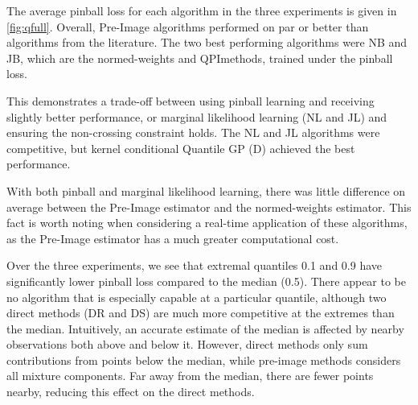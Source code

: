 \documentclass[twoside]{article} \usepackage{aistats2017}
\theoremstyle{definition}
\theoremstyle{theorem}
\newcommand{\qpi}{QPI}
\begin{document}
		The average pinball loss for each algorithm in the three experiments is given in \cref{fig:qfull}. Overall, Pre-Image algorithms performed on par or better than algorithms from the literature. The two best performing algorithms were NB and JB, which are the normed-weights and \qpi\space methods, trained under the pinball loss. %

		This demonstrates a trade-off between using pinball learning and receiving slightly better performance, or marginal likelihood learning (NL and JL) and ensuring the non-crossing constraint holds. The NL and JL algorithms were competitive, but kernel conditional Quantile GP (D) achieved the best performance.

		With both pinball and marginal likelihood learning, there was little difference on average between the Pre-Image estimator and the normed-weights estimator. This fact is worth noting when considering a real-time application of these algorithms, as the Pre-Image estimator has a much greater computational cost.
		
		Over the three experiments, we see that extremal quantiles 0.1 and 0.9 have significantly lower pinball loss compared to the median (0.5). There appear to be no algorithm that is especially capable at a particular quantile, although two direct methods (DR and DS) are much more competitive at the extremes than the median. Intuitively, an accurate estimate of the median is affected by nearby observations both above and below it. However, direct methods only sum contributions from points below the median, while pre-image methods considers all mixture components. Far away from the median, there are fewer points nearby, reducing this effect on the direct methods.
		
		
\end{document}
